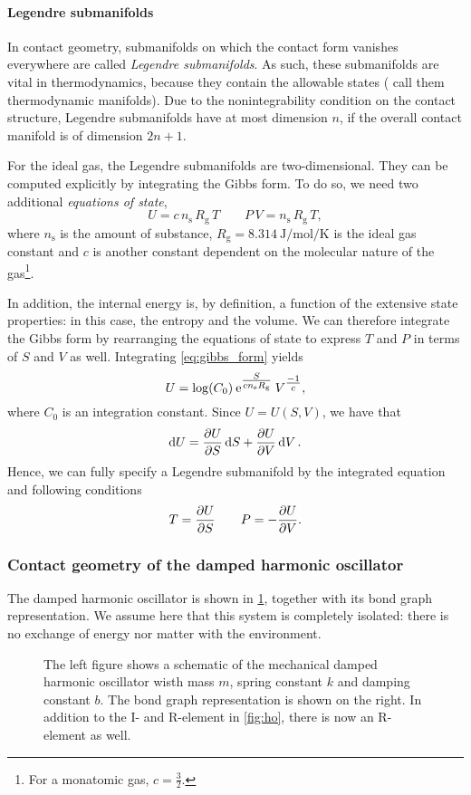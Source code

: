 \paragraph{Legendre submanifolds} In contact geometry, submanifolds on which the contact form vanishes everywhere are called \emph{Legendre submanifolds}. As such, these submanifolds are vital in thermodynamics, because they contain the allowable states (\citet{Balian2001} call them thermodynamic manifolds). Due to the nonintegrability condition on the contact structure, Legendre submanifolds have at most dimension $n$, if the overall contact manifold is of dimension $2n + 1$.

For the ideal gas, the Legendre submanifolds are two-dimensional. They can be computed explicitly by integrating the Gibbs form. To do so, we need two additional \emph{equations of state}, 
\begin{equation}
    U = c\, n_\text{s}\, R_\text{g}\, T \qquad P \, V = n_\text{s} \, R_\text{g} \, T,
\end{equation}
where $n_\text{s}$ is the amount of substance, $R_\text{g} = \SI{8.314}{\joule \per \mole \per \kelvin}$ is the ideal gas constant and $c$ is another constant dependent on the molecular nature of the gas\footnote{For a monatomic gas, $c = \tfrac{3}{2}$.}. 

In addition, the internal energy is, by definition, a function of the extensive state properties: in this case, the entropy and the volume. We can therefore integrate the Gibbs form by rearranging the equations of state to express $T$ and $P$ in terms of $S$ and $V$ as well. Integrating \cref{eq:gibbs_form} yields
$$
    U = \log(C_0) \: \mathrm{e}^{\tfrac{S}{cn_\text{s}R_\text{g}}} \: V^{\tfrac{-1}{c}},
$$
where $C_0$ is an integration constant. Since $ U = U(S, V)$, we have that
$$ \dd{U} = \pdv{U}{S}\dd{S} + \pdv{U}{V}\dd{V}. $$
Hence, we can fully specify a Legendre submanifold by the integrated equation and following conditions
$$ T = \pdv{U}{S} \qquad P = -\pdv{U}{V}. $$

\subsubsection{Contact geometry of the damped harmonic oscillator}
The damped harmonic oscillator is shown in \cref{fig:dho}, together with its bond graph representation. We assume here that this system is completely isolated: there is no exchange of energy nor matter with the environment.  
\begin{figure}[ht!]
    \centering
    
    \caption{The left figure shows a schematic of the mechanical damped harmonic oscillator wisth mass $m$, spring constant $k$ and damping constant $b$. The bond graph representation is shown on the right. In addition to the I- and R-element in \cref{fig:ho}, there is now an R-element as well.}
    \label{fig:dho}
\end{figure}


